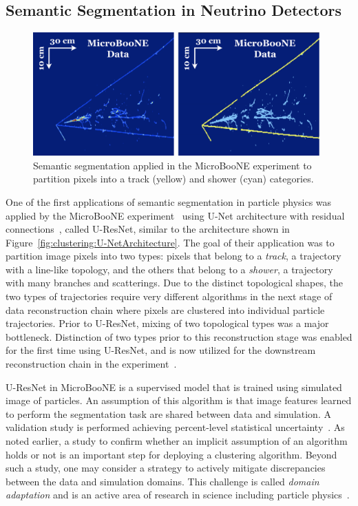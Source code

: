 \documentclass{ws-rv9x6}
\begin{document}
\subsection{Semantic Segmentation in Neutrino Detectors}
\begin{figure}[t]
    \centering
    \includegraphics[width=0.98\textwidth]{figures/uresnet_uboone.pdf}
    \caption{Semantic segmentation applied in the MicroBooNE experiment to partition pixels into a track (yellow) and shower (cyan) categories.}
    \label{fig:clustering:UBooNE}
\end{figure}
One of the first applications of semantic segmentation in particle physics was applied by the MicroBooNE experiment~\cite{PhysRevD.99.092001} using U-Net architecture with residual connections~\cite{he2015deep}, called U-ResNet, similar to the architecture shown in Figure~\ref{fig:clustering:U-NetArchitecture}. The goal of their application was to partition image pixels into two types: pixels that belong to a {\it track}, a trajectory with a line-like topology, and the others that belong to a {\it shower}, a trajectory with many branches and scatterings. Due to the distinct topological shapes, the two types of trajectories require very different algorithms in the next stage of data reconstruction chain where pixels are clustered into individual particle trajectories. Prior to U-ResNet, mixing of two topological types was a major bottleneck. Distinction of two types prior to this reconstruction stage was enabled for the first time using U-ResNet, and is now utilized for the downstream reconstruction chain in the experiment~\cite{collaboration2020vertexfinding}.  

U-ResNet in MicroBooNE is a supervised model that is trained using simulated image of particles. An assumption of this algorithm is that image features learned to perform the segmentation task are shared between data and simulation. A validation study is performed achieving percent-level statistical uncertainty~\cite{PhysRevD.99.092001}. As noted earlier, a study to confirm whether an implicit assumption of an algorithm holds or not is an important step for deploying a clustering algorithm. Beyond such a study, one may consider a strategy to actively mitigate discrepancies between the data and simulation domains. This challenge is called {\it domain adaptation} and is an active area of research in science including particle physics~\cite{wang2018deep,louppe2017learning,Perdue_2018}. 
\end{document}

